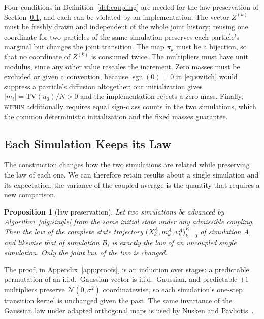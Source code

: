 \documentclass[smallextended,nospthms]{svjour3}
\theoremstyle{plain}
\newtheorem{proposition}{Proposition}[section]
\theoremstyle{definition}
\theoremstyle{remark}
\numberwithin{equation}{section}
\newcommand{\sgn}{\operatorname{sgn}}
\newcommand{\wit}{\textnormal{\textsc{within}}}
\begin{document}
Four conditions in Definition~\ref{def:coupling} are needed for the law
preservation of Section~\ref{sec:law}, and each can be violated by an
implementation. The vector $Z^{(k)}$ must be freshly drawn and independent of
the whole joint history; reusing one coordinate for two particles of the same
simulation preserves each particle's marginal but changes the joint transition.
The map $\pi_k$ must be a bijection, so that no coordinate of $Z^{(k)}$ is
consumed twice. The multipliers must have unit modulus, since any other value
rescales the increment. Zero masses must be excluded or given a convention,
because $\sgn(0)=0$ in \eqref{eq:switch} would suppress a particle's diffusion
altogether; our initialization gives $|m_i|=\mathrm{TV}(u_0)/N>0$ and the
implementation rejects a zero mass. Finally, \wit{} additionally requires equal
sign-class counts in the two simulations, which the common deterministic
initialization and the fixed masses guarantee.

\subsection{Each Simulation Keeps its Law}
\label{sec:law}

The construction changes how the two simulations are related while preserving
the law of each one. We can therefore retain results about a single simulation
and its expectation; the variance of the coupled average is the quantity that
requires a new comparison.

\begin{proposition}[law preservation]
\label{prop:law}
Let two simulations be advanced by Algorithm~\ref{alg:single} from the same
initial state under any admissible coupling. Then the law of the complete
state trajectory $\bigl(X^A_k,m^A_k,v^A_k\bigr)_{k=0}^{K}$ of simulation $A$,
and likewise that of simulation $B$, is exactly the law of an uncoupled single
simulation. Only the joint law of the two is changed.
\end{proposition}

The proof, in Appendix~\ref{app:proofs}, is an induction over stages: a
predictable permutation of an i.i.d.\ Gaussian vector is i.i.d.\ Gaussian, and
predictable $\pm1$ multipliers preserve $\mathcal N(0,\sigma^2)$ coordinatewise,
so each simulation's one-step transition kernel is unchanged given the past.
The same invariance of the Gaussian law under adapted orthogonal maps is used
by Nüsken and Pavliotis~\citep[Lemma~74, Appendix A]{nusken2018}.
\end{document}
